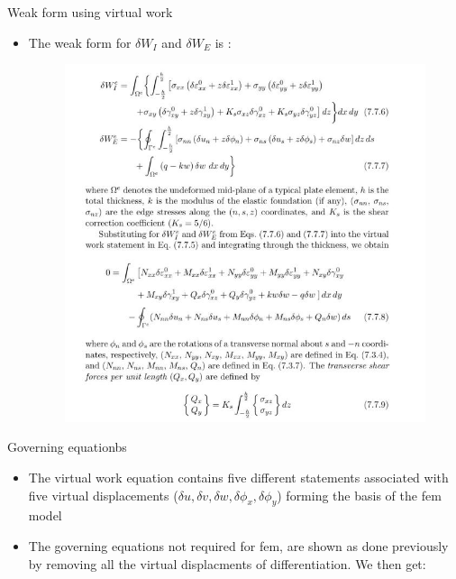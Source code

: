 	\begin{frame}{Weak form using virtual work}
		\begin{itemize}
			\item The weak form for $\delta W_I$ and $\delta W_E$ is :
			\begin{figure}
				\centering
				\includegraphics[width=0.7\linewidth]{Figure/fig45}  		
			\end{figure}
		\end{itemize}
	\end{frame}


	\begin{frame}{Governing equationbs}
		\begin{itemize}
			\item The virtual work equation contains five different statements associated with five virtual displacements ($\delta u, \delta v, \delta w, \delta \phi_x, \delta \phi_y$) forming the basis of the fem model
			\item The governing equations not required for fem, are shown as done previously by removing all the virtual displacments of differentiation. We then get:
		\end{itemize}
	\end{frame}


